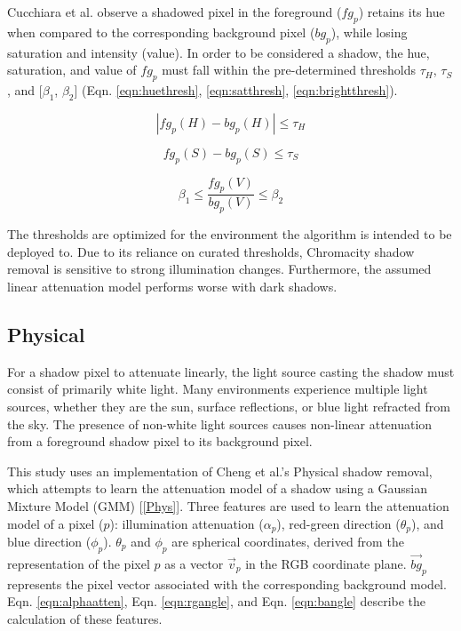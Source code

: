 Cucchiara et al. observe a shadowed pixel in the foreground ($fg_{p}$) retains its hue when compared to the corresponding background pixel ($bg_{p}$), while losing saturation and intensity (value). In order to be considered a shadow, the hue, saturation, and value of $fg_{p}$ must fall within the pre-determined thresholds $\tau_{H}$, $\tau_{S}$, and [$\beta_{1}$, $\beta_{2}$] (Eqn. \ref{eqn:huethresh}, \ref{eqn:satthresh}, \ref{eqn:brightthresh}).

\begin{equation} \label{eqn:huethresh}
| fg_{p}(H) - bg_{p}(H) | \leq \tau_{H}
\end{equation}

\begin{equation} \label{eqn:satthresh}
fg_{p}(S) - bg_{p}(S) \leq \tau_{S}
\end{equation}

\begin{equation} \label{eqn:brightthresh}
\beta_{1} \leq \dfrac{fg_{p}(V)}{bg_{p}(V)} \leq \beta_{2}
\end{equation}

The thresholds are optimized for the environment the algorithm is intended to be deployed to. Due to its reliance on curated thresholds, Chromacity shadow removal is sensitive to strong illumination changes. Furthermore, the assumed linear attenuation model performs worse with dark shadows. 

\subsection{Physical}

For a shadow pixel to attenuate linearly, the light source casting the shadow must consist of primarily white light. Many environments experience multiple light sources, whether they are the sun, surface reflections, or blue light refracted from the sky. The presence of non-white light sources causes non-linear attenuation from a foreground shadow pixel to its background pixel.

This study uses an implementation of Cheng et al.'s Physical shadow removal, which attempts to learn the attenuation model of a shadow using a Gaussian Mixture Model (GMM) [\ref{Phys}]. Three features are used to learn the attenuation model of a pixel ($p$): illumination attenuation ($\alpha_{p}$), red-green direction ($\theta_{p}$), and blue direction ($\phi_{p}$). $\theta_{p}$ and $\phi_{p}$ are spherical coordinates, derived from the representation of the pixel $p$ as a vector $\vec{v}_{p}$ in the RGB coordinate plane. $\vec{bg}_{p}$ represents the pixel vector associated with the corresponding background model. Eqn. \ref{eqn:alphaatten}, Eqn. \ref{eqn:rgangle}, and Eqn. \ref{eqn:bangle} describe the calculation of these features.

